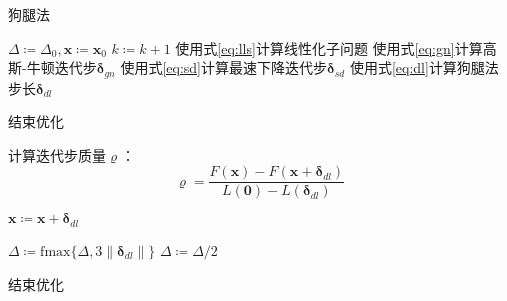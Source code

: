 \begin{algorithm}[htb!]
\caption{狗腿法}
\begin{algorithmic}
    \State $\Delta \coloneqq \Delta_0, \bm{x} \coloneqq \bm{x}_0$
        \State $k \coloneqq k+1$
        \State 使用式\eqref{eq:lls}计算线性化子问题
        \State 使用式\eqref{eq:gn}计算高斯-牛顿迭代步$\bm{\delta}_{gn}$
        \State 使用式\eqref{eq:sd}计算最速下降迭代步$\bm{\delta}_{sd}$
        \State 使用式\eqref{eq:dl}计算狗腿法步长$\bm{\delta}_{dl}$

            \State 结束优化
        \EndIf

        \State 计算迭代步质量$\varrho$：
        \[
            \varrho = \frac {F(\bm{x})-F(\bm{x}+\bm{\delta}_{dl})}
                            {L(\bm{0})-L(\bm{\delta}_{dl})}
        \]

            \State $\bm{x} \coloneqq \bm{x} + \bm{\delta}_{dl}$
        \EndIf

            \State $\Delta \coloneqq \text{fmax}\{\Delta,3\left\|\bm{\delta}_{dl}\right\|\}$
            \State $\Delta \coloneqq \Delta/2$
        \EndIf

            \State 结束优化
        \EndIf
    \EndFor
\end{algorithmic}
\label{alg:dogleg}
\end{algorithm}
